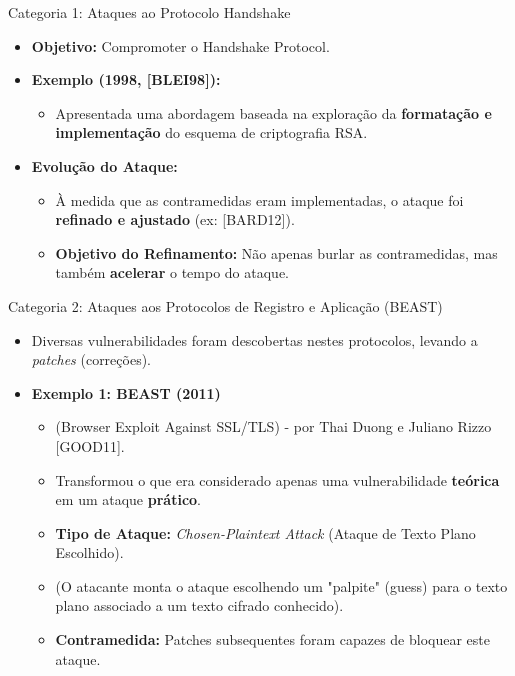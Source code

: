 \begin{frame}{Categoria 1: Ataques ao Protocolo Handshake}
    \begin{itemize}
        \item \textbf{Objetivo:} Compromoter o Handshake Protocol.

        \item \textbf{Exemplo (1998, [BLEI98]):}
              \begin{itemize}
                  \item Apresentada uma abordagem baseada na exploração da \textbf{formatação e implementação} do esquema de criptografia RSA.
              \end{itemize}

        \item \textbf{Evolução do Ataque:}
              \begin{itemize}
                  \item À medida que as contramedidas eram implementadas, o ataque foi \textbf{refinado e ajustado} (ex: [BARD12]).
                  \item \textbf{Objetivo do Refinamento:} Não apenas burlar as contramedidas, mas também \textbf{acelerar} o tempo do ataque.
              \end{itemize}
    \end{itemize}
\end{frame}

\begin{frame}{Categoria 2: Ataques aos Protocolos de Registro e Aplicação (BEAST)}
    \begin{itemize}
        \item Diversas vulnerabilidades foram descobertas nestes protocolos, levando a \textit{patches} (correções).

        \item \textbf{Exemplo 1: BEAST (2011)}
              \begin{itemize}
                  \item (Browser Exploit Against SSL/TLS) - por Thai Duong e Juliano Rizzo [GOOD11].
                  \item Transformou o que era considerado apenas uma vulnerabilidade \textbf{teórica} em um ataque \textbf{prático}.
                  \item \textbf{Tipo de Ataque:} \textit{Chosen-Plaintext Attack} (Ataque de Texto Plano Escolhido).
                  \item (O atacante monta o ataque escolhendo um "palpite" (guess) para o texto plano associado a um texto cifrado conhecido).
                  \item \textbf{Contramedida:} Patches subsequentes foram capazes de bloquear este ataque.
              \end{itemize}
    \end{itemize}
\end{frame}

